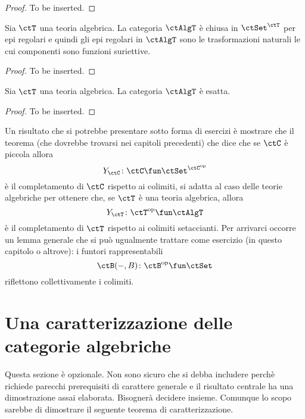 \begin{proof}
To be inserted.
\end{proof}

\begin{corollary}\label{cor_epi_AlgT}
Sia $\ctT$ una teoria algebrica. La categoria $\ctAlgT$ è chiusa in $\ctSet^{\ctT}$ per epi regolari e quindi gli epi regolari in 
$\ctAlgT$ sono le trasformazioni naturali le cui componenti sono funzioni suriettive.
\end{corollary}

\begin{proof}
To be inserted.
\end{proof}

\begin{corollary}\label{cor_AlgT_esatta}
Sia $\ctT$ una teoria algebrica. La categoria $\ctAlgT$ è esatta.
\end{corollary}

\begin{proof}
To be inserted.
\end{proof}

\begin{warning}\label{caveat_prop_univ_AlgT}
Un risultato che si potrebbe presentare sotto forma di esercizi è mostrare che il teorema (che dovrebbe trovarsi nei
capitoli precedenti) che dice che se $\ctC$ è piccola allora
$$Y_{\ctC} \colon \ctC \fun \ctSet^{\ctC^{\mathrm{op}}}$$
è il completamento di $\ctC$ rispetto ai colimiti, si adatta al caso delle teorie algebriche per ottenere che, se $\ctT$
è una teoria algebrica, allora
$$Y_{\ctT} \colon \ctT^{\mathrm{op}} \fun \ctAlgT$$
è il completamento di $\ctT$ rispetto ai colimiti setaccianti. Per arrivarci occorre un lemma generale che si può 
ugualmente trattare come esercizio (in questo capitolo o altrove): i funtori rappresentabili
$$\ctB(-,B) \colon \ctB^{\mathrm{op}} \fun \ctSet$$
riflettono collettivamente i colimiti.
\end{warning} 

\section{Una caratterizzazione delle categorie algebriche}\label{sec_caract_AlgT}

\begin{warning}\label{caveat_sec_caract_AlgT}
Questa sezione è opzionale. Non sono sicuro che si debba includere perchè richiede parecchi prerequisiti di carattere
generale e il risultato centrale ha una dimostrazione assai elaborata. Bisognerà decidere insieme. Comunque lo scopo
sarebbe di dimostrare il seguente teorema di caratterizzazione.
\end{warning}

